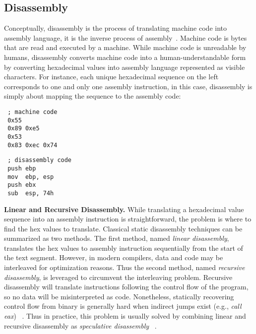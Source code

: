 \subsection{Disassembly} \label{sec:background-disassembly}
Conceptually, disassembly is the process of translating machine code into
assembly language, it is the inverse process of
assembly~\cite{schwarz2002disassembly,wang2015reassembleable,bauman2018superset}.
Machine code is bytes that are read and executed by a machine. While machine
code is unreadable by humans, disassembly converts machine code into a
human-understandable form by converting hexadecimal values into assembly
language represented as visible characters.
For instance, each unique hexadecimal sequence on the left corresponds to one
and only one assembly instruction, in this case, disassembly is simply about
mapping the sequence to the assembly code:

\vspace*{3pt}
\noindent\hspace*{36pt}\begin{minipage}{.40\linewidth}
\begin{lstlisting}
 ; machine code
 0x55
 0x89 0xe5
 0x53
 0x83 0xec 0x74
\end{lstlisting}
\end{minipage}\hspace*{24pt}
\begin{minipage}{.40\linewidth}
\begin{lstlisting}
 ; disassembly code
 push ebp
 mov  ebp, esp
 push ebx
 sub  esp, 74h
\end{lstlisting}
\end{minipage}

\noindent \textbf{Linear and Recursive Disassembly.} While translating a
hexadecimal value sequence into an assembly instruction is straightforward,
the problem is where to find the hex values to translate. Classical static
disassembly techniques can be summarized as two methods. The first method,
named \textit{linear disassembly}, translates the hex values to assembly
instruction sequentially from the start of the text segment. However, in
modern compilers, data and code may be interleaved for optimization reasons.
Thus the second method, named \textit{recursive disassembly}, is leveraged to
circumvent the interleaving problem. Recursive disassembly will translate
instructions following the control flow of the program, so no data will be
misinterpreted as code. Nonetheless, statically recovering control flow from
binary is generally hard when indirect jumps exist (e.g., \textit{call eax})
~\cite{shoshitaishvili2016sok}.
Thus in practice, this problem is usually solved by combining linear and
recursive disassembly as \textit{speculative disassembly}
~\cite{cifuentes2000uqbt}.

